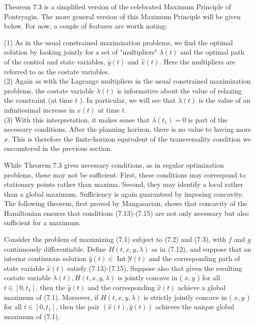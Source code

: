 \documentclass[\topdir/lecture_notes.tex]{subfiles}
\begin{document}
Theorem 7.3 is a simplified version of the celebrated Maximum Principle of Pontryagin. The more general version of this Maximum Principle will be given below. For now, a couple of features are worth noting:

(1) As in the usual constrained maximization problems, we find the optimal solution by looking jointly for a set of "multipliers" $\lambda(t)$ and the optimal path of the control and state variables, $\hat{y}(t)$ and $\hat{x}(t)$. Here the multipliers are referred to as the costate variables.\\
(2) Again as with the Lagrange multipliers in the usual constrained maximization problems, the costate variable $\lambda(t)$ is informative about the value of relaxing the constraint (at time $t$ ). In particular, we will see that $\lambda(t)$ is the value of an infinitesimal increase in $x(t)$ at time $t$.\\
(3) With this interpretation, it makes sense that $\lambda\left(t_{1}\right)=0$ is part of the necessary conditions. After the planning horizon, there is no value to having more $x$. This is therefore the finite-horizon equivalent of the transversality condition we encountered in the previous section.

While Theorem 7.3 gives necessary conditions, as in regular optimization problems, these may not be sufficient. First, these conditions may correspond to stationary points rather than maxima. Second, they may identify a local rather than a global maximum. Sufficiency is again guaranteed by imposing concavity. The following theorem, first proved by Mangasarian, shows that concavity of the Hamiltonian ensures that conditions (7.13)-(7.15) are not only necessary but also sufficient for a maximum.

\begin{theorem}
Consider the problem of maximizing (7.1) subject to (7.2) and (7.3), with $f$ and $g$ continuously differentiable. Define $H(t, x, y, \lambda)$ as in (7.12), and suppose that an interior continuous solution $\hat{y}(t) \in \operatorname{Int} \mathcal{Y}(t)$ and the corresponding path of state variable $\hat{x}(t)$ satisfy (7.13)-(7.15). Suppose also that given the resulting costate variable $\lambda(t), H(t, x, y, \lambda)$ is jointly concave in ( $x, y$ ) for all $t \in\left[0, t_{1}\right]$, then the $\hat{y}(t)$ and the corresponding $\hat{x}(t)$ achieve a global maximum of (7.1). Moreover, if $H(t, x, y, \lambda)$ is strictly jointly concave in ( $x, y$ ) for all $t \in\left[0, t_{1}\right]$, then the pair $(\hat{x}(t), \hat{y}(t))$ achieves the unique global maximum of (7.1).
\end{theorem}
\end{document}
